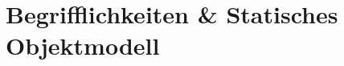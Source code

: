 

\newcommand{\dozent}{Lutz Prechelt}
\newcommand{\tutor}{Samuel Domiks}
\newcommand{\tutoriumNo}{02\\Materialien: Latex, Skript}
\newcommand{\ubungNo}{06}
\newcommand{\veranstaltung}{Softwaretechnik}
\newcommand{\semester}{SoSe21}
\newcommand{\studenten}{Jonny Lam \& Thore Brehmer}




\section{Begrifflichkeiten & Statisches Objektmodell}
